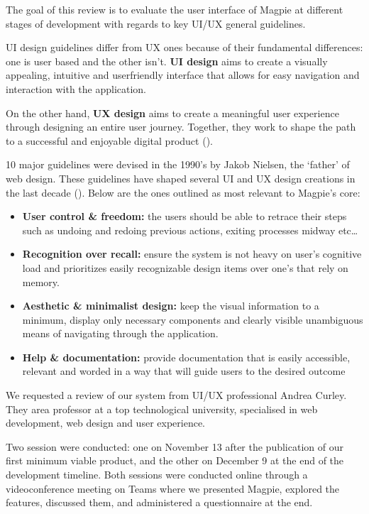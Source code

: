 The goal of this review is to evaluate the user interface of Magpie at different
stages of development with regards to key UI/UX general guidelines.

UI design guidelines differ from UX ones because of their fundamental
differences: one is user based and the other isn't. \textbf{UI design} aims to
create a visually appealing, intuitive and user\-friendly interface that allows
for easy navigation and interaction with the application.

On the other hand, \textbf{UX design} aims to create a meaningful user
experience through designing an entire user journey. Together, they work to
shape the path to a successful and enjoyable digital product
(\cite{uiuxguidelines2023}).

10 major guidelines were devised in the 1990's by Jakob Nielsen, the
`father' of web design. These guidelines have shaped several UI and UX design
creations in the last decade (\cite{uiuxguidelinesnielsen2016}). Below are the
ones outlined as most relevant to Magpie's core:
\begin{itemize}
    \item \textbf{User control \& freedom:} the users should be able to retrace
          their steps such as undoing and redoing previous actions, exiting processes
          midway etc\ldots
          
    \item \textbf{Recognition over recall:} ensure the system is not heavy on
          user's cognitive load and prioritizes easily recognizable design items over
          one's that rely on memory.
          
    \item \textbf{Aesthetic \& minimalist design:} keep the visual information
          to a minimum, display only necessary components and clearly visible
          unambiguous means of navigating through the application.
          
    \item \textbf{Help \& documentation:} provide documentation that is easily
          accessible, relevant and worded in a way that will guide users to the
          desired outcome
\end{itemize}

We requested a review of our system from UI/UX professional Andrea
Curley. They area  professor at a top technological university, specialised in
web development, web design and user experience.

\noindent Two session were conducted: one on November 13 after the publication
of our first minimum viable product, and the other on December 9 at the end of
the development timeline. Both sessions were conducted online through a
videoconference meeting on Teams where we presented Magpie, explored the
features, discussed them, and administered a questionnaire at the end.

